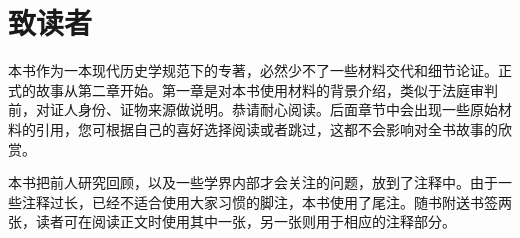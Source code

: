 \chapter*{致读者}

本书作为一本现代历史学规范下的专著，必然少不了一些材料交代和细节论证。正式的故事从第二章开始。第一章是对本书使用材料的背景介绍，类似于法庭审判前，对证人身份、证物来源做说明。恭请耐心阅读。后面章节中会出现一些原始材料的引用，您可根据自己的喜好选择阅读或者跳过，这都不会影响对全书故事的欣赏。



本书把前人研究回顾，以及一些学界内部才会关注的问题，放到了注释中。由于一些注释过长，已经不适合使用大家习惯的脚注，本书使用了尾注。随书附送书签两张，读者可在阅读正文时使用其中一张，另一张则用于相应的注释部分。

